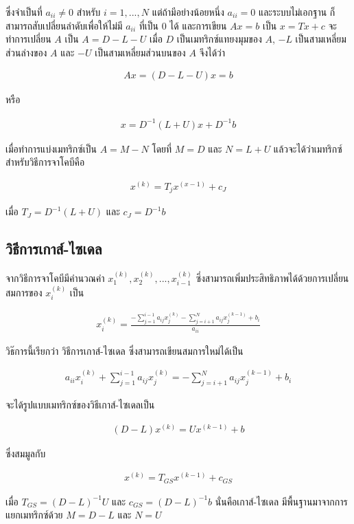 ซึ่งจำเป็นที่ $a_{ii} \neq 0$ สำหรับ $i = 1,..., N $ แต่ถ้ามีอย่างน้อยหนึ่ง $a_{ii} = 0$ และระบบไม่เอกฐาน ก็สามารถสับเปลี่ยนลำดับเพื่อให้ไม่มี $a_{ii}$ ที่เป็น 0 ได้ และการเขียน $Ax = b$ เป็น $x = Tx +c$ จะทำการเปลี่ยน $A$ เป็น $A = D - L - U$ เมื่อ $D$ เป็นเมทริกซ์แทยงมุมของ $A$, $-L$ เป็นสามเหลี่ยมส่วนล่างของ $A$ และ $-U$ เป็นสามเหลี่ยมส่วนบนของ $A$ จึงได้ว่า

\begin{align}
    Ax = (D - L - U)x = b    
\end{align}

หรือ

\begin{align}
    x = D^{-1} (L+U)x + D^{-1}b
\end{align}

เมื่อทำการแบ่งเมทริกซ์เป็น $A = M - N$ โดยที่ $M = D$ และ $N = L + U$ แล้วจะได้ว่าเมทริกซ์สำหรับวิธีการจาโคบีคือ

\begin{align}
    x^(k) = T_{j}x^(x-1) + c_J
\end{align}

เมื่อ $T_J = D^{-1}(L+U)$ และ $c_J = D^{-1}b$

\subsection{วิธีการเกาส์-ไซเดล}
จากวิธีการจาโคบีมีคำนวณคำ $x_1^{(k)},x_2^{(k)}, ... , x_{i-1}^{(k)}$ ซึ่งสามารถเพิ่มประสิทธิภาพได้ด้วยการเปลี่ยนสมการของ $x_i^{(k)}$ เป็น 

\begin{align}
    x_i^{(k)} = \frac{-\sum_{j=1}^{i-1} a_{ij}x_{j}^{(k)} - \sum_{j=i+1}^{N} a_{ij}x_{j}^{(k-1)} + b_i }{a_{ii}}
\end{align}

วิธ๊การนี้เรียกว่า วิธีการเกาส์-ไซเดล ซึ่งสามารถเขียนสมการใหม่ได้เป็น

\begin{align}
    a_{ii} x_{i}^{(k)} + \sum_{j=1}^{i-1} a_{ij} x_{j}^{(k)} = - \sum_{j=i+1}^{N} a_{ij} x_j^{(k-1)} + b_i
\end{align}

จะได้รูปแบบเมทริกซ์ของวิธีเกาส์-ไซเดลเป็น

\begin{align}
    (D - L) x^{(k)} = U x^{(k-1)} + b
\end{align}

ซึ่งสมมูลกับ

\begin{align}
    x^{(k)} = T_{GS} x^{(k-1)} + c_{GS}
\end{align}

เมื่อ $T_{GS} = (D - L)^{-1} U$ และ $c_{GS} = (D - L)^{-1} b$ นั่นคือเกาส์-ไซเดล มีพื้นฐานมาจากการแยกเมทริกซ์ด้วย $M = D - L$ และ $N = U$